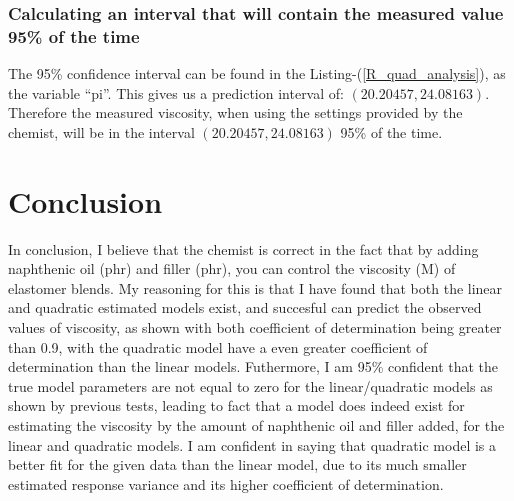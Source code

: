 \documentclass[12pt]{article}
\begin{document}
\subsubsection{Calculating an interval that will contain the measured value 95\% of the time}
The 95\% confidence interval can be found in the Listing-(\ref{R_quad_analysis}), as the variable \enquote{pi}. This gives us a prediction interval of: $(20.20457, 24.08163)$. Therefore the measured viscosity, when using the settings provided by the chemist, will be in the interval $(20.20457, 24.08163)$ 95\% of the time.


\newpage
\section{Conclusion}
In conclusion, I believe that the chemist is correct in the fact that by adding naphthenic oil (phr) and filler (phr), you can control the viscosity (M) of elastomer blends. My reasoning for this is that I have found that both the linear and quadratic estimated models exist, and succesful can predict the observed values of viscosity, as shown with both coefficient of determination being greater than 0.9, with the quadratic model have a even greater coefficient of determination than the linear models. Futhermore, I am 95\% confident that the true model parameters are not equal to zero for the linear/quadratic models as shown by previous tests, leading to fact that a model does indeed exist for estimating the viscosity by the amount of naphthenic oil and filler added, for the linear and quadratic models. I am confident in saying that quadratic model is a better fit for the given data than the linear model, due to its much smaller estimated response variance and its higher coefficient of determination.


\newpage
\end{document}
